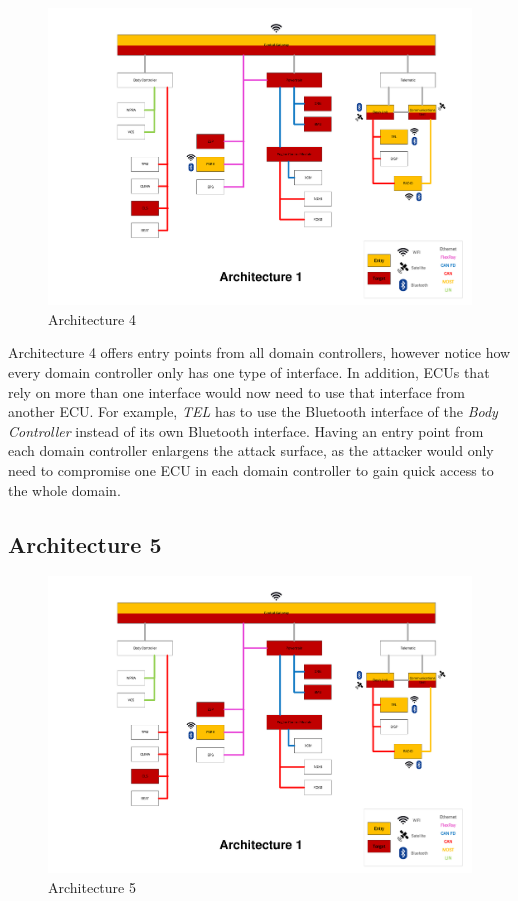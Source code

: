\begin{figure}[h!]
    \caption{Architecture 4}
    \includegraphics[width=\textwidth, page=4]{../Architectures-survey.pdf}
\end{figure}

Architecture 4 offers entry points from all domain controllers, however notice how every domain controller only has one type of interface.
In addition, ECUs that rely on more than one interface would now need to use that interface from another ECU.
For example, \textit{TEL} has to use the Bluetooth interface of the \textit{Body Controller} instead of its own Bluetooth interface.
Having an entry point from each domain controller enlargens the attack surface, as the attacker would only need to compromise one ECU in each domain controller to gain quick access to the whole domain.\par


\subsection{Architecture 5}
\label{subsec:arch5}

\begin{figure}[h!]
    \caption{Architecture 5}
    \includegraphics[width=\textwidth, page=5]{../Architectures-survey.pdf}
\end{figure}

